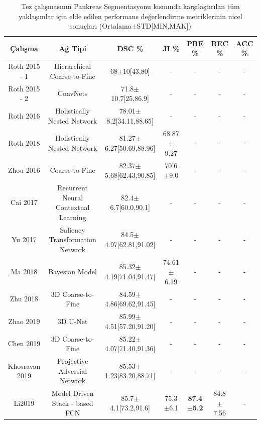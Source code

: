 \begin{table}
	\centering
	\caption{Tez çalışmasının Pankreas Segmentasyonu kısmında karşılaştırılan tüm yaklaşımlar için elde edilen performans değerlendirme metriklerinin nicel sonuçları (Ortalama$\pm$STD[MIN,MAK])}
	\label{tab:comp_panc}
	\begin{adjustbox}{width=\textwidth}
		\begin{tabular}{ccccccc}
			\toprule
			Çalışma   &    Ağ Tipi  & DSC \%  & JI \% &  PRE \% & REC \% & ACC \% \\ 
			\midrule 
			Roth 2015 - 1 \cite{roth2015deeporgan}  &  Hierarchical Coarse-to-Fine  & 68$\pm$10[43,80]  &   -   &   -    & -  & - \\ 
			Roth 2015 - 2 \cite{roth2015deep}  &  ConvNets  & 71.8$\pm$10.7[25,86.9] &   -  &   -   & - & - \\ 
			Roth 2016   \cite{roth2016spatial}  &  Holistically Nested Network  & 78.01$\pm$8.2[34.11,88.65] &  -   &  -  &  - & - \\ 
			Roth 2018     \cite{roth2018spatial} &  Holistically Nested Network   & 81.27$\pm$6.27[50.69,88.96] &  68.87$\pm$9.27 &  - & -  & - \\ 
			Zhou 2016  \cite{zhou2016pancreas} &  Coarse-to-Fine   & 82.37$\pm$5.68[62.43,90.85] & 70.6$\pm$9.0  &   -  & - & - \\ 
			Cai 2017  \cite{cai2017improving}  & Recurrent Neural Contextual Learning & 82.4$\pm$6.7[60.0,90.1]  & -  &  -  & - & - \\ 
			Yu  2017      \cite{yu2018recurrent} &  Saliency Transformation Network  & 84.5$\pm$4.97[62.81,91.02] &  - &   -  & - & - \\ 
			Ma 2018 \cite{ma2018novel}  &    Bayesian Model  & 85.32$\pm$4.19[71.04,91.47] &  74.61$\pm$6.19 & -  & - & - \\ 
			Zhu 2018 \cite{zhu20183d} &  3D Coarse-to-Fine  & 84.59$\pm$4.86[69.62,91.45] &  -   &  -  &  - & - \\ 
			Zhao 2019  \cite{zhao2019fully} &  3D U-Net & 85.99$\pm$4.51[57.20,91.20] &  - &   -  & - & - \\ 
			Chen 2019  \cite{chen2019harnessing}  &  3D Coarse-to-Fine  & 85.22$\pm$4.07[71.40,91.36] &  -  &   -  &  - & - \\ 
			Khosravan 2019 \cite{khosravan2019pan} & Projective Adversial Network & 85.53$\pm$1.23[83.20,88.71] &  - & - & - & - \\ 
			Li2019   \cite{li2020model}  &  Model Driven Stack - based FCN & 85.7$\pm$4.1[73.2,91.6]   &   75.3$\pm$6.1  &  \textbf{87.4$\pm$5.2}  &  84.8$\pm$7.56 & - \\ 

\end{tabular}
\end{adjustbox}
\end{table}
